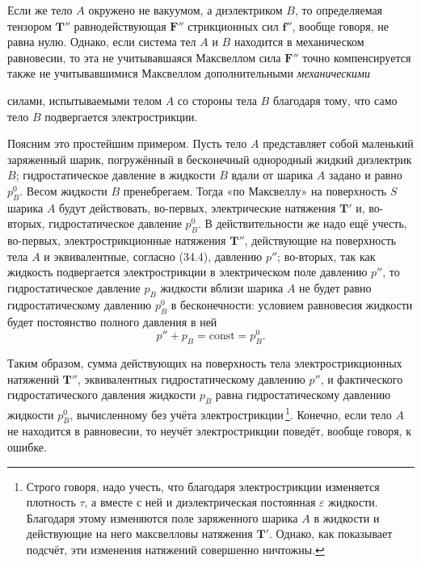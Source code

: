 \documentclass[a4paper,12pt]{article}
\begin{document}
Если же тело $A$ окружено не вакуумом, а диэлектриком $B$, то
определяемая тензором $\mathbf{T}''$ равнодействующая $\mathbf{F}''$
стрикционных сил $\mathbf{f}''$, вообще говоря, не равна нулю. Однако,
если система тел $A$ и $B$ находится в механическом равновесии, то эта
не учитывавшаяся Максвеллом сила $\mathbf{F}''$ точно компенсируется
также не учитывавшимися Максвеллом дополнительными \textit{механическими}


















силами, испытываемыми телом $A$ со стороны тела $B$ благодаря
тому, что само тело $B$ подвергается электрострикции.

Поясним это простейшим примером. Пусть тело $A$ представляет
собой маленький заряженный шарик, погружённый в бесконечный
однородный жидкий диэлектрик $B$; гидростатическое давление
в жидкости $B$ вдали от шарика $A$ задано и равно $p_B^0$. Весом
жидкости $B$ пренебрегаем. Тогда «по Максвеллу» на поверхность
$S$ шарика $A$ будут действовать, во-первых, электрические натяжения
$\mathbf{T}'$ и, во-вторых, гидростатическое давление $p_B^0$.
В действительности же надо ещё учесть, во-первых, электрострикционные
натяжения $\mathbf{T}''$, действующие на поверхность тела $A$
и эквивалентные, согласно (34.4), давлению $p''$; во-вторых, так
как жидкость подвергается электрострикции в электрическом поле
давлению $p''$, то гидростатическое давление $p_B$ жидкости вблизи
шарика $A$ не будет равно гидростатическому давлению $p_B^0$
в бесконечности: условием равновесия жидкости будет постоянство
полного давления в ней
$$
    p'' + p_B = \mathrm{const} = p_B^0.
$$

Таким образом, сумма действующих на поверхность тела электрострикционных
натяжений $\mathbf{T}''$, эквивалентных гидростатическому давлению
$p''$, и фактического гидростатического давления жидкости $p_B$ равна
гидростатическому давлению жидкости $p_B^0$, вычисленному без учёта
электрострикции\,\footnote{Строго говоря, надо учесть, что благодаря
электрострикции изменяется плотность $\tau$, а вместе с ней и
диэлектрическая постоянная $\varepsilon$ жидкости. Благодаря этому
изменяются поле заряженного шарика $A$ в жидкости и действующие на него
максвелловы натяжения $\mathbf{T}'$. Однако, как показывает подсчёт,
эти изменения натяжений совершенно ничтожны.}. Конечно, если тело $A$
не находится в равновесии, то неучёт электрострикции поведёт, вообще
говоря, к ошибке.
\end{document}
